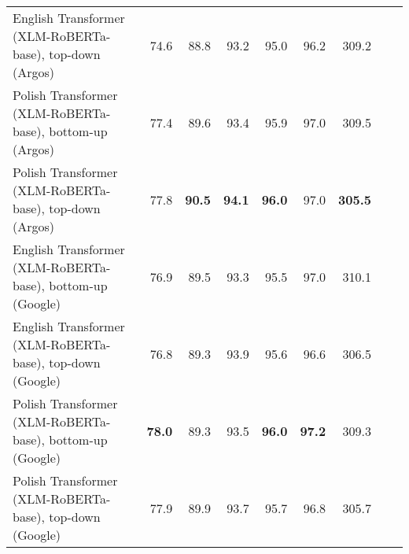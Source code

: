 \begin{table}[ht!]
{\begin{tabular}{lrrrrrrrr}
  English Transformer (XLM-RoBERTa-base), top-down (Argos) & 74.6 & 88.8 & 93.2 & 95.0 & 96.2 & 309.2 \\ 
  Polish Transformer (XLM-RoBERTa-base), bottom-up (Argos) & 77.4 & 89.6 & 93.4 & 95.9 & 97.0 & 309.5 \\ 
  Polish Transformer (XLM-RoBERTa-base), top-down (Argos) & 77.8 & \textbf{90.5} & \textbf{94.1} & \textbf{96.0} & 97.0 & \textbf{305.5} \\ 
  English Transformer (XLM-RoBERTa-base), bottom-up (Google) & 76.9 & 89.5 & 93.3 & 95.5 & 97.0 & 310.1 \\ 
  English Transformer (XLM-RoBERTa-base), top-down (Google) & 76.8 & 89.3 & 93.9 & 95.6 & 96.6 & 306.5 \\ 
  Polish Transformer (XLM-RoBERTa-base), bottom-up (Google) & \textbf{78.0} & 89.3 & 93.5 & \textbf{96.0} & \textbf{97.2} & 309.3 \\ 
  Polish Transformer (XLM-RoBERTa-base), top-down (Google) & 77.9 & 89.9 & 93.7 & 95.7 & 96.8 & 305.7 \\ 
   \hline
\end{tabular}
}
\end{table}




